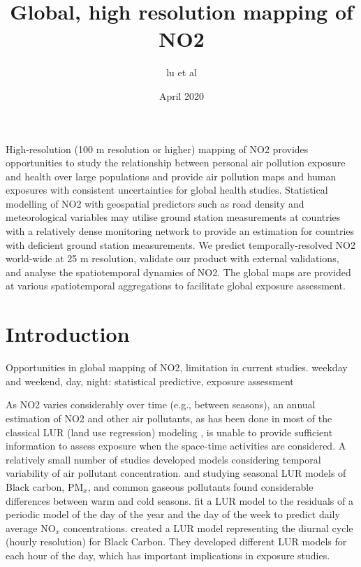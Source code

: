 \documentclass{article}
\title{Global, high resolution mapping of NO2}
\author{lu et al}
\date{April 2020}
\begin{document}
\maketitle

\abstract

High-resolution (100 m resolution or higher) mapping of NO2 provides opportunities to study the relationship between personal air pollution exposure and health over large populations and provide air pollution maps and human exposures with consistent uncertainties for global health studies. Statistical modelling of NO2 with geospatial predictors such as road density and meteorological variables may utilise ground station measurements at countries with a relatively dense monitoring network to provide an estimation for countries with deficient ground station measurements. We predict temporally-resolved NO2 world-wide at 25 m resolution, validate our product with external validations, and analyse the spatiotemporal dynamics of NO2. The global maps are provided at various spatiotemporal aggregations %
to facilitate global exposure assessment. 

\section{Introduction}
Opportunities in global mapping of NO2, limitation in current studies. 
weekday and weekend, day, night: statistical predictive, exposure assessment

As NO2 varies considerably over time (e.g., between seasons), an annual estimation of NO2 and other air pollutants, as has been done in most of the classical LUR (land use regression) modeling \citep{Eeftens2012}, is unable to provide sufficient information to assess exposure when the space-time activities are considered. A relatively small number of studies developed models considering temporal variability of air pollutant concentration. \cite{BONIARDI2019108520} and \cite{CORDIOLI20171075} studying seasonal LUR models of Black carbon, PM$_x$, and common gaseous pollutants found considerable differences between warm and cold seasons.  \cite{rahman2017development} fit a LUR model to the residuals of a  periodic model of the day of the year and the day of the week to predict daily average  NO$_x$ concentrations. \cite{dons2013modeling} created a LUR model representing the diurnal cycle (hourly resolution) for Black Carbon. They developed different LUR models for each hour of the day, which has important implications in exposure studies.
\end{document}
